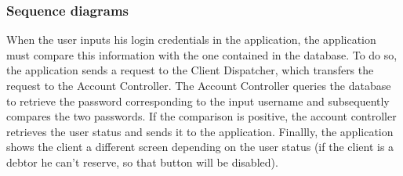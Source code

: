 \documentclass{article}
\begin{document}
\subsubsection{Sequence diagrams}


\begin{figure}[ht]
\end{figure}
When the user inputs his login credentials in the application, the application must compare this information with the one contained in the database. To do so, the application sends a request to the Client Dispatcher, which transfers the request to the Account Controller. The Account Controller queries the database to retrieve the password corresponding to the input username and subsequently compares the two passwords. If the comparison is positive, the account controller retrieves the user status and sends it to the application. Finallly, the application shows the client a different screen depending on the user status (if the client is a debtor he can't reserve, so that button will be disabled).
\newpage
\begin{figure}[ht]
\end{figure}
\end{document}
